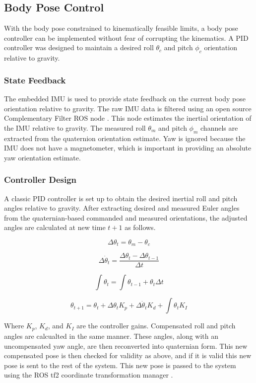 \subsection{ Body Pose Control }

With the body pose constrained to kinematically feasible limits, a body pose controller can be implemented without fear of corrupting the kinematics. A PID controller was designed to maintain a desired roll $\theta_c$ and pitch $\phi_c$ orientation relative to gravity. 

\subsubsection{ State Feedback }
The embedded IMU is used to provide state feedback on the current body pose orientation relative to gravity. The raw IMU data is filtered using an open source Complementary Filter ROS node \cite{complementaryfilter}. This node estimates the inertial orientation of the IMU relative to gravity. The measured roll $\theta_m$ and pitch $\phi_m$ channels are extracted from the quaternion orientation estimate. Yaw is ignored because the IMU does not have a magnetometer, which is important in providing an absolute yaw orientation estimate. 

\subsubsection{ Controller Design }
A classic PID controller is set up to obtain the desired inertial roll and pitch angles relative to gravity. After extracting desired and measured Euler angles from the quaternian-based commanded and measured orientations, the adjusted angles are calculated at new time $t+1$ as follows.

\begin{equation}
    \Delta \theta_t = \theta_m - \theta_c
\end{equation}

\begin{equation}
    \Delta \dot{\theta}_t = \frac{ \Delta \theta_t - \Delta \theta_{t-1}}{\Delta t}
\end{equation}

\begin{equation}
    \int \theta_t = \int \theta_{t-1} + \theta_t \Delta t
\end{equation}

\begin{equation}
    \theta_{t+1} = \theta_{t} +  \Delta \theta_t K_p + \Delta \dot{\theta}_t K_d + \int \theta_t K_I
\end{equation}

Where $K_p$, $K_d$, and $K_I$ are the controller gains. Compensated roll and pitch angles are calcualted in the same manner. These angles, along with an uncompensated yaw angle, are then reconverted into quaternian form. This new compensated pose is then checked for validity as above, and if it is valid this new pose is sent to the rest of the system. This new pose is passed to the system using the ROS tf2 coordinate transformation manager \cite{tf2}.
